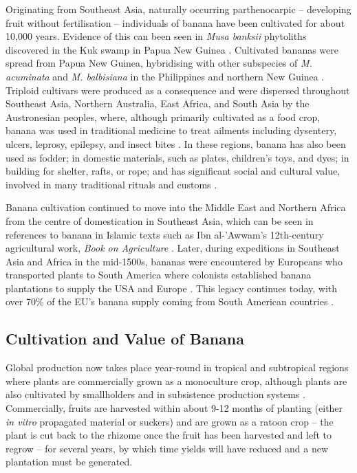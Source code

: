 Originating from Southeast Asia, naturally occurring parthenocarpic – developing fruit without fertilisation – individuals of banana have been cultivated for about 10,000 years. Evidence of this can been seen in \textit{Musa banksii} phytoliths discovered in the Kuk swamp in Papua New Guinea \parencite{Denham2011}.  Cultivated bananas were spread from Papua New Guinea, hybridising with other subspecies of \textit{M. acuminata} and \textit{M. balbisiana} in the Philippines and northern New Guinea \parencite{Perrier2009}. Triploid cultivars were produced as a consequence and were dispersed throughout Southeast Asia, Northern Australia, East Africa, and South Asia by the Austronesian peoples, where, although primarily cultivated as a food crop, banana was used in traditional medicine to treat ailments including dysentery, ulcers, leprosy, epilepsy, and insect bites \parencite{Kumar2012}. In these regions, banana has also been used as fodder; in domestic materials, such as plates, children’s toys, and dyes; in building for shelter, rafts, or rope; and has significant social and cultural value, involved in many traditional rituals and customs \parencite{Hapsari2017} .  

Banana cultivation continued to move into the Middle East and Northern Africa from the centre of domestication in Southeast Asia, which can be seen in references to banana in Islamic texts such as Ibn al-'Awwam's 12th-century agricultural work, \textit{Book on Agriculture} \parencite{Clement1866}. Later, during expeditions in Southeast Asia and Africa in the mid-1500s, bananas were encountered by Europeans who transported plants to South America where colonists established banana plantations to supply the USA and Europe \parencite{Guzman-Rivas1960, Salas-Pascual2022}. This legacy continues today, with over 70\% of the EU’s banana supply coming from South American countries \parencite{EuropeanUnion2022}.  

\subsection{Cultivation and Value of Banana}

Global production now takes place year-round in tropical and subtropical regions where plants are commercially grown as a monoculture crop, although plants are also cultivated by smallholders and in subsistence production systems \parencite{Viljoen2020}. Commercially, fruits are harvested within about 9-12 months of planting (either\textit{ in vitro} propagated material or suckers) and are grown as a ratoon crop – the plant is cut back to the rhizome once the fruit has been harvested and left to regrow – for several years, by which time yields will have reduced and a new plantation must be generated. 

